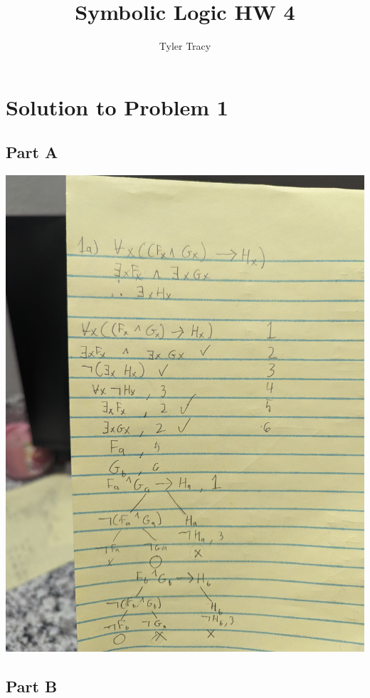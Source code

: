 \documentclass[12pt]{article}
\title{Symbolic Logic HW 4}
\author{Tyler Tracy}
\begin{document}
\section*{Solution to Problem 1}

\subsection*{Part A}

\includegraphics[width=\textwidth]{1a}

\subsection*{Part B}
\end{document}
